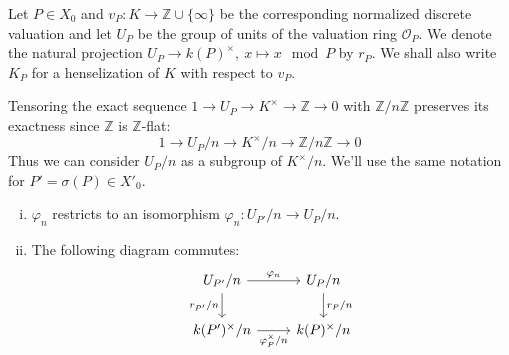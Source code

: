 Let $P\in X_0$ and $v_P:K\to\mathbb{Z}\cup\{\infty\}$ be the corresponding normalized discrete valuation and let $U_P$ be the group of units of the valuation ring $\mathcal{O}_P$. We denote the natural projection $U_P\to k(P)^\times,\ x\mapsto x\mod P$ by $r_P$. We shall also write $K_P$ for a henselization of $K$ with respect to $v_P$.

Tensoring the exact sequence $1\to U_P\to K^\times \to\mathbb{Z}\to 0$ with $\mathbb{Z}/n\mathbb{Z}$ preserves its exactness since $\mathbb{Z}$ is $\mathbb{Z}$-flat:
\[ 1\longrightarrow U_P/n\longrightarrow K^\times/n\longrightarrow\mathbb{Z}/n\mathbb{Z}\longrightarrow 0 \]
Thus we can consider $U_P/n$ as a subgroup of $K^\times/n$. We'll use the same notation for $P' = \sigma(P)\in X'_0$.

\begin{lemma}\label{4.3}
\begin{enumerate}[(i)]
\item $\varphi_n$ restricts to an isomorphism $\varphi_n: U_{P'}/n\to U_P/n$.
\item The following diagram commutes:
\[ \begin{tikzcd}
U_{P'}/n \rar["\varphi_n"] \dar["r_{P'}/n"'] & U_P/n \dar["r_P/n"]\\
k(P')^\times/n \rar["\varphi_P^\times/n"'] & k(P)^\times/n
\end{tikzcd} \]
\end{enumerate}
\end{lemma}

